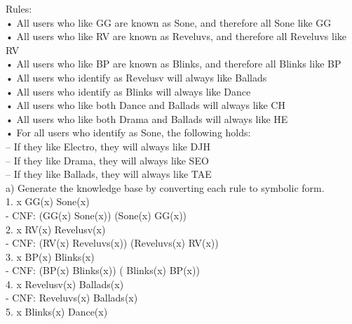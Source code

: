 \documentclass{article}
\begin{document}
Rules: \\
• All users who like GG are known as Sone, and therefore all Sone like GG\\
• All users who like RV are known as Reveluvs, and therefore all Reveluvs like RV\\
• All users who like BP are known as Blinks, and therefore all Blinks like BP\\
• All users who identify as Revelusv will always like Ballads\\
• All users who identify as Blinks will always like Dance\\
• All users who like both Dance and Ballads will always like CH\\
• All users who like both Drama and Ballads will always like HE\\
• For all users who identify as Sone, the following holds:\\
– If they like Electro, they will always like DJH\\
– If they like Drama, they will always like SEO\\
– If they like Ballads, they will always like TAE\\

a) Generate the knowledge base by converting each rule to symbolic form.\\

1. \forall x \: GG(x) \Leftrightarrow Sone(x)\\

\: \: \: \: - CNF: (\neg GG(x) \vee Sone(x)) \wedge (\neg Sone(x) \vee GG(x))\\

2. \forall x \: RV(x) \Leftrightarrow Revelusv(x)\\

\: \: \: \: - CNF: (\neg RV(x) \vee Reveluvs(x)) \wedge (\neg Reveluvs(x) \vee RV(x))\\

3. \forall x \: BP(x) \Leftrightarrow Blinks(x)\\

\: \: \: \: - CNF: (\neg BP(x) \vee Blinks(x)) \wedge ( \neg Blinks(x) \vee BP(x))\\

4. \forall x \: Revelusv(x) \Rightarrow Ballads(x)\\

\: \: \: \: - CNF: \neg Reveluvs(x) \wedge Ballads(x)\\

5. \forall x \: Blinks(x) \Rightarrow Dance(x)\\
\end{document}
